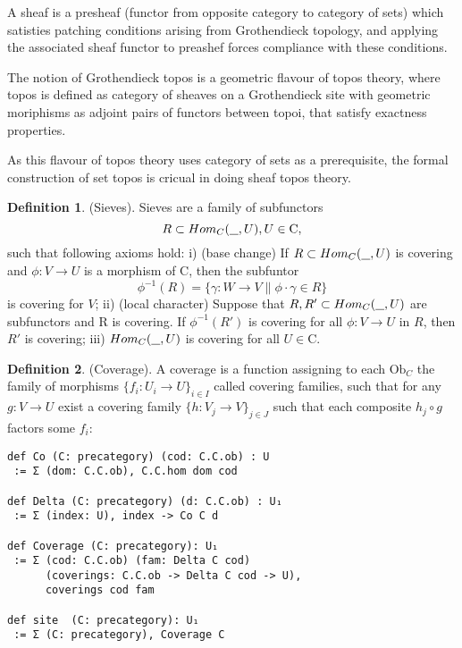 \documentclass{article}
\theoremstyle{definition}
\newtheorem{definition}{Definition}
\def\mapright#1{\xrightarrow{{#1}}}
\def\mapdown#1{\Big\downarrow\rlap{\raise2pt{\scriptstyle{#1}}}}
\def\mapdiagl#1{\vcenter{\searrow}\rlap{\raise2pt{\scriptstyle{#1}}}}
\def\mapdiagr#1{\vcenter{\swarrow}\rlap{\raise2pt{\scriptstyle{#1}}}}
\def\under{\underline{\hspace{0.25cm}}}
\begin{document}
A sheaf is a presheaf (functor from opposite category to category of sets) which
satisties patching conditions arising from Grothendieck topology, and applying
the associated sheaf functor to preashef forces compliance with these conditions.

The notion of Grothendieck topos is a geometric flavour of topos theory,
where topos is defined as category of sheaves on a Grothendieck site with
geometric moriphisms as adjoint pairs of functors between topoi, that
satisfy exactness properties. \cite{Jardine15}

As this flavour of topos theory uses category of sets as a prerequisite,
the formal construction of set topos is cricual in doing sheaf topos theory.

\begin{definition} (Sieves).
Sieves are a family of subfunctors
$$\def\mapright#1{\xrightarrow{{#1}}}
  \def\mapdown#1{\Big\downarrow\rlap{\raise2pt{\scriptstyle{#1}}}}
  \def\mapdiagl#1{\vcenter{\searrow}\rlap{\raise2pt{\scriptstyle{#1}}}}
  \def\mapdiagr#1{\vcenter{\swarrow}\rlap{\raise2pt{\scriptstyle{#1}}}}
  R \subset Hom_C(\under,U), U \in \mathrm{C},
$$
such that following axioms hold: i) (base change) If $R \subset Hom_C(\under,U)$ is covering
and $\phi : V \rightarrow U$ is a morphism of $\mathrm{C}$, then the subfuntor
$$
   \phi^{-1}(R) = \{ \gamma : W \rightarrow V \| \phi \cdot \gamma \in R \}
$$
is covering for $V$; ii) (local character) Suppose that $R,R' \subset Hom_C(\under,U)$ are
subfunctors and R is covering. If $\phi^{-1}(R')$ is covering for
all $\phi : V \rightarrow U$ in $R$, then $R'$ is covering; iii)
$Hom_C(\under,U)$ is covering for all $U \in \mathrm{C}$.
\end{definition}

\newpage
\begin{definition} (Coverage).
A coverage is a function assigning
to each $\mathrm{Ob}_C$ the family of morphisms $\{f_i : U_i \rightarrow U \}_{i\in I}$ called
covering families, such that for any $g: V \rightarrow U$ exist
a covering family $\{h:V_j \rightarrow V\}_{j \in J}$ such that
each composite $h_j \circ g$ factors some $f_i$:
\begin{lstlisting}
def Co (C: precategory) (cod: C.C.ob) : U
 := Σ (dom: C.C.ob), C.C.hom dom cod

def Delta (C: precategory) (d: C.C.ob) : U₁
 := Σ (index: U), index -> Co C d

def Coverage (C: precategory): U₁
 := Σ (cod: C.C.ob) (fam: Delta C cod)
      (coverings: C.C.ob -> Delta C cod -> U),
      coverings cod fam

def site  (C: precategory): U₁
 := Σ (C: precategory), Coverage C
\end{lstlisting}
\end{definition}
\end{document}
